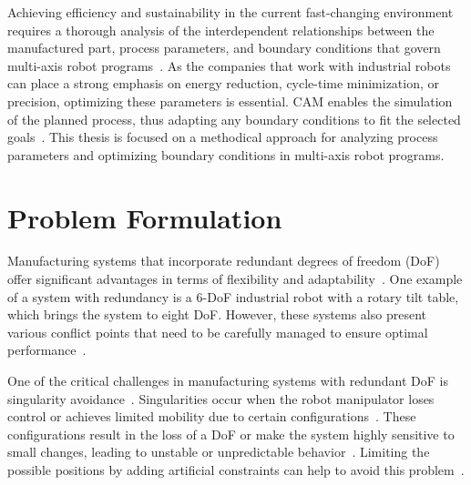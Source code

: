 Achieving efficiency and sustainability in the current fast-changing environment requires a thorough analysis of the interdependent relationships between the manufactured part, process parameters, and boundary conditions that govern multi-axis robot programs~\cite{Pan, Gadaleta.2019}. As the companies that work with industrial robots can place a strong emphasis on energy reduction, cycle-time minimization, or precision, optimizing these parameters is essential. CAM enables the simulation of the planned process, thus adapting any boundary conditions to fit the selected goals~\cite{Kyratsis.2020,Maiti.2017,Pan,Uhlmann.2016}.
This thesis is focused on a methodical approach for analyzing process parameters and optimizing boundary conditions in multi-axis robot programs. 

\section{Problem Formulation}\label{Problem Formulation}
Manufacturing systems that incorporate redundant degrees of freedom (DoF) offer significant advantages in terms of flexibility and adaptability~\cite{Anjum.2022}. One example of a system with redundancy is a 6-DoF industrial robot with a rotary tilt table, which brings the system to eight DoF. However, these systems also present various conflict points that need to be carefully managed to ensure optimal performance~\cite{Boscariol.2020, Liu.2022}.


One of the critical challenges in manufacturing systems with redundant DoF is singularity avoidance~\cite{Liu.2022}. Singularities occur when the robot manipulator loses control or achieves limited mobility due to certain configurations~\cite{Malyshev.2022}. These configurations result in the loss of a DoF or make the system highly sensitive to small changes, leading to unstable or unpredictable behavior~\cite{Zhao.2021, Milenkovic.2021}. Limiting the possible positions by adding artificial constraints can help to avoid this problem~\cite{Faria.2018}. %


